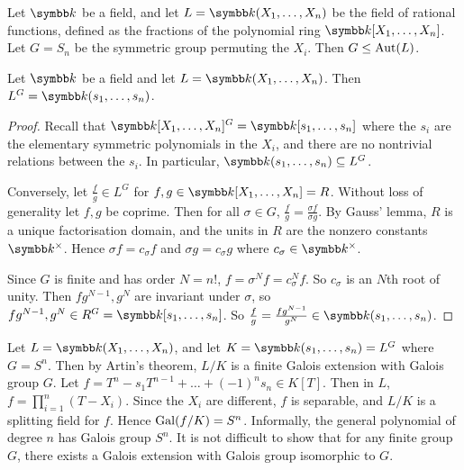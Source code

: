 \begin{example}
	Let \( \symbb k \) be a field, and let \( L = \symbb k(X_1, \dots, X_n) \) be the field of rational functions, defined as the fractions of the polynomial ring \( \symbb k[X_1, \dots, X_n] \).
	Let \( G = S_n \) be the symmetric group permuting the \( X_i \).
	Then \( G \leq \operatorname{Aut}(L) \).
\end{example}
\begin{theorem}
	Let \( \symbb k \) be a field and let \( L = \symbb k(X_1, \dots, X_n) \).
	Then \( L^G = \symbb k(s_1, \dots, s_n) \).
\end{theorem}
\begin{proof}
	Recall that \( \symbb k[X_1, \dots, X_n]^G = \symbb k[s_1, \dots, s_n] \) where the \( s_i \) are the elementary symmetric polynomials in the \( X_i \), and there are no nontrivial relations between the \( s_i \).
	In particular, \( \symbb k(s_1, \dots, s_n) \subseteq L^G \).

	Conversely, let \( \frac{f}{g} \in L^G \) for \( f, g \in \symbb k[X_1, \dots, X_n] = R \).
	Without loss of generality let \( f, g \) be coprime.
	Then for all \( \sigma \in G \), \( \frac{f}{g} = \frac{\sigma f}{\sigma g} \).
	By Gauss' lemma, \( R \) is a unique factorisation domain, and the units in \( R \) are the nonzero constants \( \symbb k^\times \).
	Hence \( \sigma f = c_\sigma f \) and \( \sigma g = c_\sigma g \) where \( c_\sigma \in \symbb k^\times \).

	Since \( G \) is finite and has order \( N = n! \), \( f = \sigma^N f = c_\sigma^N f \).
	So \( c_\sigma \) is an \( N \)th root of unity.
	Then \( fg^{N-1}, g^N \) are invariant under \( \sigma \), so \( fg^{N-1}, g^N \in R^G = \symbb k[s_1, \dots, s_n] \).
	So \( \frac{f}{g} = \frac{fg^{N-1}}{g^N} \in \symbb k(s_1, \dots, s_n) \).
\end{proof}
\begin{example}
	Let \( L = \symbb k(X_1, \dots, X_n) \), and let \( K = \symbb k(s_1, \dots, s_n) = L^G \) where \( G = S^n \).
	Then by Artin's theorem, \( L/K \) is a finite Galois extension with Galois group \( G \).
	Let \( f = T^n - s_1 T^{n-1} + \dots + (-1)^n s_n \in K[T] \).
	Then in \( L \), \( f = \prod_{i=1}^n (T - X_i) \).
	Since the \( X_i \) are different, \( f \) is separable, and \( L / K \) is a splitting field for \( f \).
	Hence \( \operatorname{Gal}(f/K) = S^n \).
	Informally, the general polynomial of degree \( n \) has Galois group \( S^n \).
	It is not difficult to show that for any finite group \( G \), there exists a Galois extension with Galois group isomorphic to \( G \).
\end{example}

